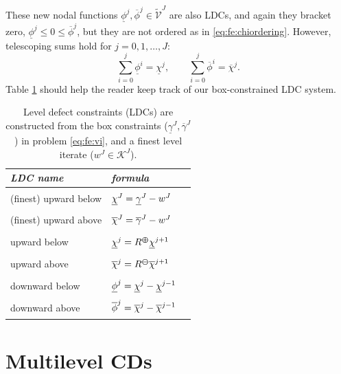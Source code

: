 \documentclass[letterpaper,final,12pt,reqno]{amsart}
\theoremstyle{cstyle}
\theoremstyle{cstyle*}
\theoremstyle{dstyle}
\numberwithin{equation}{section}
\numberwithin{figure}{section}
\numberwithin{table}{section}
\numberwithin{theorem}{section}
\newcommand{\cK}{\mathcal{K}}
\newcommand{\maxR}{R^{\bm{\oplus}}}
\newcommand{\minR}{R^{\bm{\ominus}}}
\begin{document}
These new nodal functions $\underline{\phi}^{j},\overline{\phi}^{j} \in \tilde{\mathcal{V}}^J$ are also LDCs, and again they bracket zero, $\underline{\phi}^j \le 0 \le \overline{\phi}^j$, but they are not ordered as in \eqref{eq:fe:chiordering}.  However, telescoping sums hold for $j=0,1,\dots,J$:
\begin{equation}
\sum_{i=0}^j \underline{\phi}^i = \underline{\chi}^j, \qquad \sum_{i=0}^j \overline{\phi}^i = \overline{\chi}^j.  \label{eq:fe:telescoping}
\end{equation}
Table \ref{tab:ldcs} should help the reader keep track of our box-constrained LDC system.

\begin{table}[H]
\begin{tabular}{llc}
\emph{LDC name}        & \emph{formula} \\ \hline
(finest) upward below & ${\Large \strut} \underline{\chi}^J = \underline{\gamma}^J - w^J$ \\
(finest) upward above & ${\Large \strut} \overline{\chi}^J = \overline{\gamma}^J - w^J$ \\
upward below          & ${\Large \strut} \underline{\chi}^{j} = \maxR \underline{\chi}^{j+1}$ \\
upward above          & ${\Large \strut} \overline{\chi}^{j} = \minR \overline{\chi}^{j+1}$ \\
downward below        & ${\Large \strut} \underline{\phi}^j = \underline{\chi}^j - \underline{\chi}^{j-1}$ \\
downward above        & ${\Large \strut} \overline{\phi}^j = \overline{\chi}^j - \overline{\chi}^{j-1}$ \\
\end{tabular}

\medskip
\caption{Level defect constraints (LDCs) are constructed from the box constraints ($\underline{\gamma}^J,\overline{\gamma}^J$) in problem \eqref{eq:fe:vi}, and a finest level iterate ($w^J \in \cK^J$).}
\label{tab:ldcs}
\end{table}


\section{Multilevel CDs} \label{sec:cdmultilevel}
\end{document}
